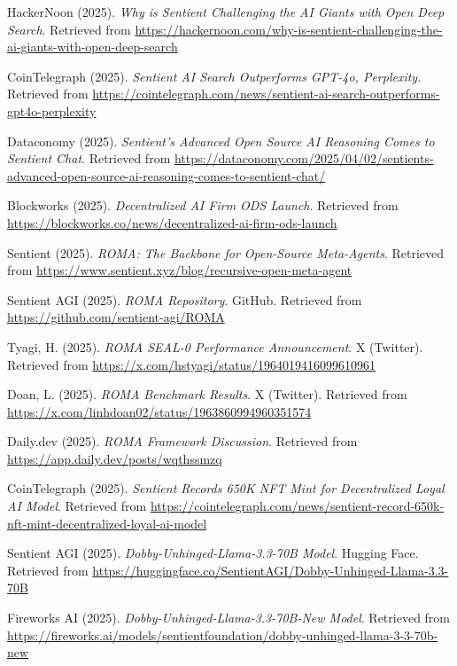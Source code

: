 \documentclass[10pt,a4paper]{article}
\begin{document}
\begin{thebibliography}{99}
HackerNoon (2025).
\textit{Why is Sentient Challenging the AI Giants with Open Deep Search}.
Retrieved from \url{https://hackernoon.com/why-is-sentient-challenging-the-ai-giants-with-open-deep-search}

CoinTelegraph (2025).
\textit{Sentient AI Search Outperforms GPT-4o, Perplexity}.
Retrieved from \url{https://cointelegraph.com/news/sentient-ai-search-outperforms-gpt4o-perplexity}

Dataconomy (2025).
\textit{Sentient's Advanced Open Source AI Reasoning Comes to Sentient Chat}.
Retrieved from \url{https://dataconomy.com/2025/04/02/sentients-advanced-open-source-ai-reasoning-comes-to-sentient-chat/}

Blockworks (2025).
\textit{Decentralized AI Firm ODS Launch}.
Retrieved from \url{https://blockworks.co/news/decentralized-ai-firm-ods-launch}

Sentient (2025).
\textit{ROMA: The Backbone for Open-Source Meta-Agents}.
Retrieved from \url{https://www.sentient.xyz/blog/recursive-open-meta-agent}

Sentient AGI (2025).
\textit{ROMA Repository}.
GitHub. Retrieved from \url{https://github.com/sentient-agi/ROMA}

Tyagi, H. (2025).
\textit{ROMA SEAL-0 Performance Announcement}.
X (Twitter). Retrieved from \url{https://x.com/hstyagi/status/1964019416099610961}

Doan, L. (2025).
\textit{ROMA Benchmark Results}.
X (Twitter). Retrieved from \url{https://x.com/linhdoan02/status/1963860994960351574}

Daily.dev (2025).
\textit{ROMA Framework Discussion}.
Retrieved from \url{https://app.daily.dev/posts/wqthssmzq}

CoinTelegraph (2025).
\textit{Sentient Records 650K NFT Mint for Decentralized Loyal AI Model}.
Retrieved from \url{https://cointelegraph.com/news/sentient-record-650k-nft-mint-decentralized-loyal-ai-model}

Sentient AGI (2025).
\textit{Dobby-Unhinged-Llama-3.3-70B Model}.
Hugging Face. Retrieved from \url{https://huggingface.co/SentientAGI/Dobby-Unhinged-Llama-3.3-70B}

Fireworks AI (2025).
\textit{Dobby-Unhinged-Llama-3.3-70B-New Model}.
Retrieved from \url{https://fireworks.ai/models/sentientfoundation/dobby-unhinged-llama-3-3-70b-new}


\end{thebibliography}
\end{document}
